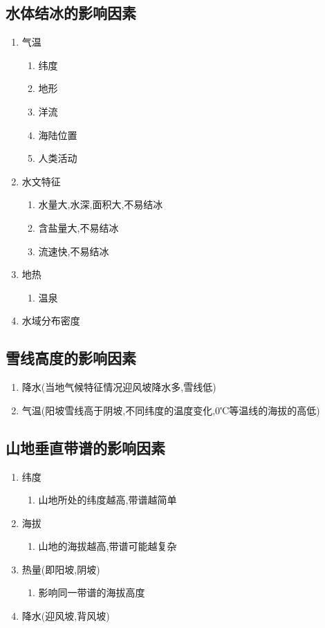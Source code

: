 \documentclass[a4paper]{article}
\begin{document}
    \subsection{水体结冰的影响因素}
    \begin{enumerate}
        \item 气温
        \begin{enumerate}
            \item 纬度
            \item 地形
            \item 洋流
            \item 海陆位置
            \item 人类活动
        \end{enumerate}
        \item 水文特征
        \begin{enumerate}
            \item 水量大,水深,面积大,不易结冰
            \item 含盐量大,不易结冰
            \item 流速快,不易结冰
        \end{enumerate}
        \item 地热
        \begin{enumerate}
            \item 温泉
        \end{enumerate}
        \item 水域分布密度
    \end{enumerate}
    \subsection{雪线高度的影响因素}
    \begin{enumerate}
        \item 降水(当地气候特征情况迎风坡降水多,雪线低)
        \item 气温(阳坡雪线高于阴坡,不同纬度的温度变化,0℃等温线的海拔的高低)
    \end{enumerate}
    \subsection{山地垂直带谱的影响因素}
    \begin{enumerate}
        \item 纬度
        \begin{enumerate}
            \item 山地所处的纬度越高,带谱越简单
        \end{enumerate}
        \item 海拔
        \begin{enumerate}
            \item 山地的海拔越高,带谱可能越复杂
        \end{enumerate}
        \item 热量(即阳坡,阴坡)
        \begin{enumerate}
            \item 影响同一带谱的海拔高度
        \end{enumerate}
        \item 降水(迎风坡,背风坡)
    \end{enumerate}
\end{document}
